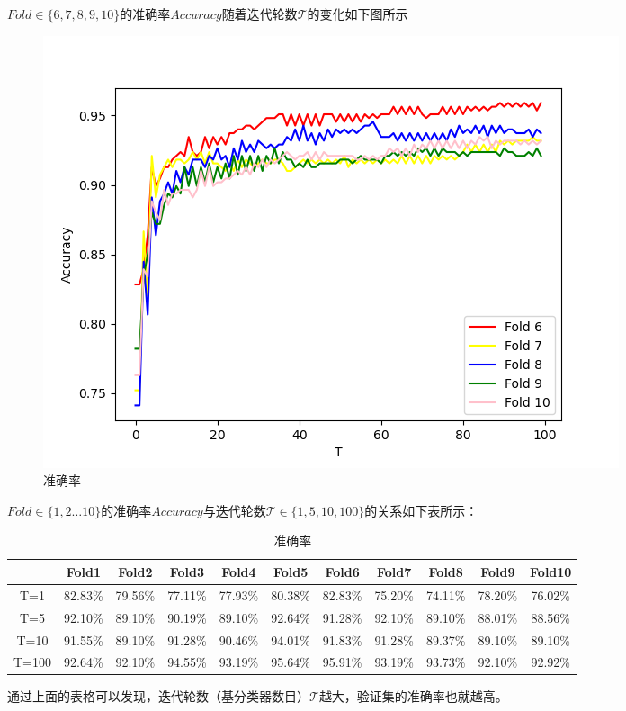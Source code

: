 \documentclass{paper}
\begin{document}
$Fold \in \{6, 7, 8, 9, 10\}$的准确率$Accuracy$随着迭代轮数$\mathcal{T}$的变化如下图所示
\begin{figure}[H]
    \centering
    \includegraphics[scale=0.59]{images/fold1.png}
    \caption{准确率}
\end{figure}

$Fold \in \{1, 2 \dots 10\}$的准确率$Accuracy$与迭代轮数$\mathcal{T} \in \{1, 5, 10, 100\}$的关系如下表所示：

\begin{table}[H]
	\centering
	\caption{准确率}
	\begin{tabular}{|c|c|c|c|c|c|c|c|c|c|c|}
		\hline
		      & Fold1 & Fold2 & Fold3 & Fold4 & Fold5 & Fold6 & Fold7 & Fold8 & Fold9 & Fold10 \\ \hline
		T=1   & 82.83\% & 79.56\% & 77.11\% & 77.93\% & 80.38\% & 82.83\% & 75.20\% & 74.11\% & 78.20\% & 76.02\% \\ \hline
		T=5   & 92.10\% & 89.10\% & 90.19\% & 89.10\% & 92.64\% & 91.28\% & 92.10\% & 89.10\% & 88.01\% & 88.56\% \\ \hline
		T=10  & 91.55\% & 89.10\% & 91.28\% & 90.46\% & 94.01\% & 91.83\% & 91.28\% & 89.37\% & 89.10\% & 89.10\% \\ \hline
		T=100 & 92.64\% & 92.10\% & 94.55\% & 93.19\% & 95.64\% & 95.91\% & 93.19\% & 93.73\% & 92.10\% & 92.92\% \\ \hline
	\end{tabular}
\end{table}

通过上面的表格可以发现，迭代轮数（基分类器数目）$\mathcal{T}$越大，验证集的准确率也就越高。
\end{document}
